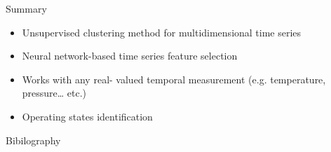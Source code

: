 \documentclass{beamer}
\begin{document}
\begin{frame}[shrink]{Summary}
  \begin{itemize}
    \item Unsupervised clustering method for multidimensional time series
    \item Neural network-based time series feature selection
    \item Works with any real-  valued temporal measurement (e.g. temperature, pressure… etc.)
    \item Operating states identification
  \end{itemize}
\end{frame}

\begin{frame}[allowframebreaks]{Bibilography}
  
  
\end{frame}
\end{document}
